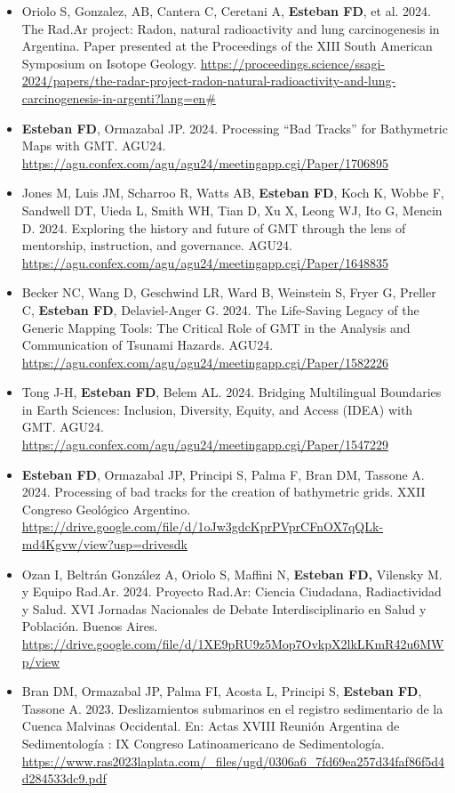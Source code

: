 \documentclass[11pt, a4paper]{article}
\begin{document}
\begin{itemize}
    \item Oriolo S, Gonzalez, AB, Cantera C, Ceretani A, \textbf{Esteban FD}, et al. 2024. The Rad.Ar project: Radon, natural radioactivity and lung carcinogenesis in Argentina. Paper presented at the Proceedings of the XIII South American Symposium on Isotope Geology. \url{https://proceedings.science/ssagi-2024/papers/the-radar-project-radon-natural-radioactivity-and-lung-carcinogenesis-in-argenti?lang=en#}
    \item \textbf{Esteban FD}, Ormazabal JP. 2024. Processing “Bad Tracks” for Bathymetric Maps with GMT. AGU24. \url{https://agu.confex.com/agu/agu24/meetingapp.cgi/Paper/1706895}
    \item Jones M, Luis JM, Scharroo R, Watts AB, \textbf{Esteban FD}, Koch K, Wobbe F, Sandwell DT, Uieda L, Smith WH, Tian D, Xu X, Leong WJ, Ito G, Mencin D. 2024. Exploring the history and future of GMT through the lens of mentorship, instruction, and governance. AGU24. \url{https://agu.confex.com/agu/agu24/meetingapp.cgi/Paper/1648835}
    \item Becker NC, Wang D, Geschwind LR, Ward B, Weinstein S, Fryer G, Preller C, \textbf{Esteban FD}, Delaviel-Anger G. 2024. The Life-Saving Legacy of the Generic Mapping Tools: The Critical Role of GMT in the Analysis and Communication of Tsunami Hazards. AGU24. \url{https://agu.confex.com/agu/agu24/meetingapp.cgi/Paper/1582226}
    \item Tong J-H, \textbf{Esteban FD}, Belem AL. 2024. Bridging Multilingual Boundaries in Earth Sciences: Inclusion, Diversity, Equity, and Access (IDEA) with GMT. AGU24. \url{https://agu.confex.com/agu/agu24/meetingapp.cgi/Paper/1547229}
    \item \textbf{Esteban FD}, Ormazabal JP, Principi S, Palma F, Bran DM, Tassone A. 2024. Processing of bad tracks for the creation of bathymetric grids. XXII Congreso Geológico Argentino. \url{https://drive.google.com/file/d/1oJw3gdcKprPVprCFnOX7qQLk-md4Kgvw/view?usp=drivesdk}
    \item Ozan I, Beltrán González A, Oriolo S, Maffini N, \textbf{Esteban FD,} Vilensky M. y Equipo Rad.Ar. 2024. Proyecto Rad.Ar: Ciencia Ciudadana, Radiactividad y Salud. XVI Jornadas Nacionales de Debate Interdisciplinario en Salud y Población. Buenos Aires. \url{https://drive.google.com/file/d/1XE9pRU9z5Mop7OvkpX2lkLKmR42u6MWp/view}
    \item Bran DM, Ormazabal JP, Palma FI, Acosta L, Principi S, \textbf{Esteban FD}, Tassone A. 2023. Deslizamientos submarinos en el registro sedimentario de la Cuenca Malvinas Occidental. En: Actas XVIII Reunión Argentina de Sedimentología : IX Congreso Latinoamericano de Sedimentología. \url{https://www.ras2023laplata.com/_files/ugd/0306a6_7fd69ea257d34faf86f5d4d284533dc9.pdf}

\end{itemize}
\end{document}
